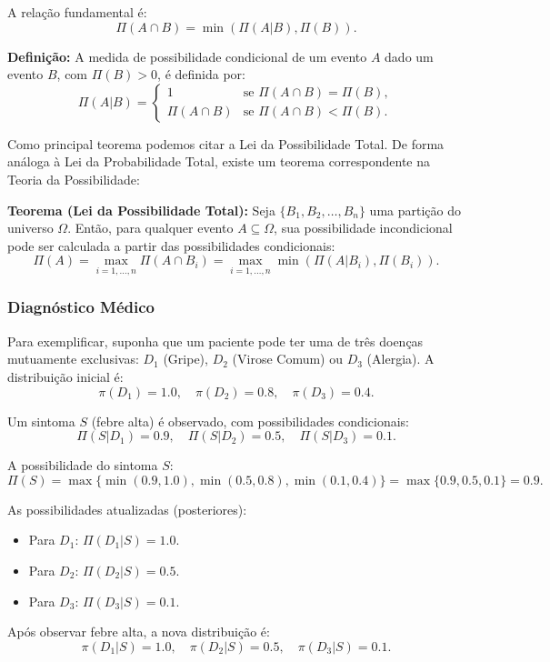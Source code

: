 \documentclass[a4paper]{article}
\begin{document}
\begin{answer}[Questão 01]
A relação fundamental é:
\[
\Pi(A \cap B) = \min(\Pi(A|B), \Pi(B)).
\]

\textbf{Definição:} A medida de possibilidade condicional de um evento $A$ dado um evento $B$, com $\Pi(B) > 0$, é definida por:
\[
\Pi(A|B) =
\begin{cases}
1 & \text{se } \Pi(A \cap B) = \Pi(B), \\
\Pi(A \cap B) & \text{se } \Pi(A \cap B) < \Pi(B).
\end{cases}
\]

Como principal teorema podemos citar a Lei da Possibilidade Total. De forma análoga à Lei da Probabilidade Total, existe um teorema correspondente na Teoria da Possibilidade:

\textbf{Teorema (Lei da Possibilidade Total):} Seja $\{B_1, B_2, \ldots, B_n\}$ uma partição do universo $\Omega$. Então, para qualquer evento $A \subseteq \Omega$, sua possibilidade incondicional pode ser calculada a partir das possibilidades condicionais:
\[
\Pi(A) = \max_{i=1,\ldots,n} \Pi(A \cap B_i) 
= \max_{i=1,\ldots,n} \min(\Pi(A|B_i), \Pi(B_i)).
\]

\subsubsection*{Diagnóstico Médico}

Para exemplificar, suponha que um paciente pode ter uma de três doenças mutuamente exclusivas: $D_1$ (Gripe), $D_2$ (Virose Comum) ou $D_3$ (Alergia). A distribuição inicial é:
\[
\pi(D_1)=1.0, \quad \pi(D_2)=0.8, \quad \pi(D_3)=0.4.
\]

Um sintoma $S$ (febre alta) é observado, com possibilidades condicionais:
\[
\Pi(S|D_1)=0.9, \quad \Pi(S|D_2)=0.5, \quad \Pi(S|D_3)=0.1.
\]

A possibilidade do sintoma $S$:
\[
\Pi(S) = \max \{\min(0.9,1.0), \min(0.5,0.8), \min(0.1,0.4)\} 
= \max\{0.9,0.5,0.1\} = 0.9.
\]

As possibilidades atualizadas (posteriores):
\begin{itemize}
  \item Para $D_1$: $\Pi(D_1|S)=1.0$.
  \item Para $D_2$: $\Pi(D_2|S)=0.5$.
  \item Para $D_3$: $\Pi(D_3|S)=0.1$.
\end{itemize}

Após observar febre alta, a nova distribuição é:
\[
\pi(D_1|S)=1.0, \quad \pi(D_2|S)=0.5, \quad \pi(D_3|S)=0.1.
\]

    \end{answer}
\end{document}
